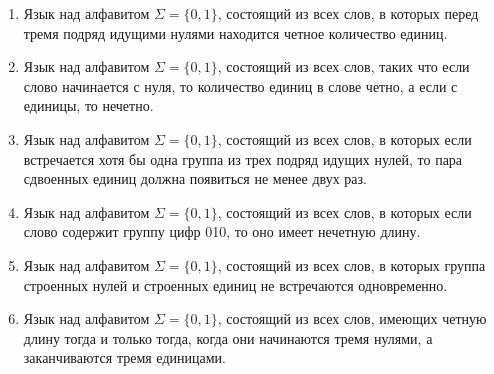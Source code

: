 \begin{enumerate}
\item Язык над алфавитом $\Sigma=\{0,1\}$, состоящий из всех слов, в которых перед тремя подряд идущими нулями находится четное количество единиц.
\item Язык над алфавитом $\Sigma=\{0,1\}$, состоящий из всех слов, таких что если слово начинается с нуля, то количество единиц в слове четно, а если с единицы, то нечетно.
\item Язык над алфавитом $\Sigma=\{0,1\}$, состоящий из всех слов, в которых если встречается хотя бы одна группа из трех подряд идущих нулей, то пара сдвоенных единиц должна появиться не менее двух раз.
\item Язык над алфавитом $\Sigma=\{0,1\}$, состоящий из всех слов, в которых если слово содержит группу цифр 010, то оно имеет нечетную длину.
\item Язык над алфавитом $\Sigma=\{0,1\}$, состоящий из всех слов, в которых группа строенных нулей и строенных единиц не встречаются одновременно.
\item Язык над алфавитом $\Sigma=\{0,1\}$, состоящий из всех слов, имеющих четную длину тогда и только тогда, когда они начинаются тремя нулями, а заканчиваются тремя единицами.

\end{enumerate}

\bigskip

